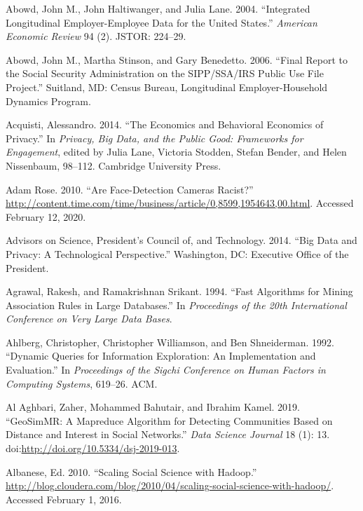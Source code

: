 \documentclass[]{krantz}
\begin{document}
\hypertarget{ref-abowd2004integrated}{}
Abowd, John M., John Haltiwanger, and Julia Lane. 2004. ``Integrated
Longitudinal Employer-Employee Data for the United States.''
\emph{American Economic Review} 94 (2). JSTOR: 224--29.

\hypertarget{ref-abowd2006final}{}
Abowd, John M., Martha Stinson, and Gary Benedetto. 2006. ``Final Report
to the Social Security Administration on the SIPP/SSA/IRS Public Use
File Project.'' Suitland, MD: Census Bureau, Longitudinal
Employer-Household Dynamics Program.

\hypertarget{ref-Acquisti2014}{}
Acquisti, Alessandro. 2014. ``The Economics and Behavioral Economics of
Privacy.'' In \emph{Privacy, Big Data, and the Public Good: Frameworks
for Engagement}, edited by Julia Lane, Victoria Stodden, Stefan Bender,
and Helen Nissenbaum, 98--112. Cambridge University Press.

\hypertarget{ref-rose2010}{}
Adam Rose. 2010. ``Are Face-Detection Cameras Racist?''
\url{http://content.time.com/time/business/article/0,8599,1954643,00.html}.
Accessed February 12, 2020.

\hypertarget{ref-house2014big}{}
Advisors on Science, President's Council of, and Technology. 2014. ``Big
Data and Privacy: A Technological Perspective.'' Washington, DC:
Executive Office of the President.

\hypertarget{ref-Agrawal1994}{}
Agrawal, Rakesh, and Ramakrishnan Srikant. 1994. ``Fast Algorithms for
Mining Association Rules in Large Databases.'' In \emph{Proceedings of
the 20th International Conference on Very Large Data Bases}.

\hypertarget{ref-ahlberg1992dynamic}{}
Ahlberg, Christopher, Christopher Williamson, and Ben Shneiderman. 1992.
``Dynamic Queries for Information Exploration: An Implementation and
Evaluation.'' In \emph{Proceedings of the Sigchi Conference on Human
Factors in Computing Systems}, 619--26. ACM.

\hypertarget{ref-aghbari2019}{}
Al Aghbari, Zaher, Mohammed Bahutair, and Ibrahim Kamel. 2019.
``GeoSimMR: A Mapreduce Algorithm for Detecting Communities Based on
Distance and Interest in Social Networks.'' \emph{Data Science Journal}
18 (1): 13.
doi:\href{https://doi.org/http://doi.org/10.5334/dsj-2019-013}{http://doi.org/10.5334/dsj-2019-013}.

\hypertarget{ref-socialhadoop}{}
Albanese, Ed. 2010. ``Scaling Social Science with Hadoop.''
\url{http://blog.cloudera.com/blog/2010/04/scaling-social-science-with-hadoop/}.
Accessed February 1, 2016.
\end{document}
